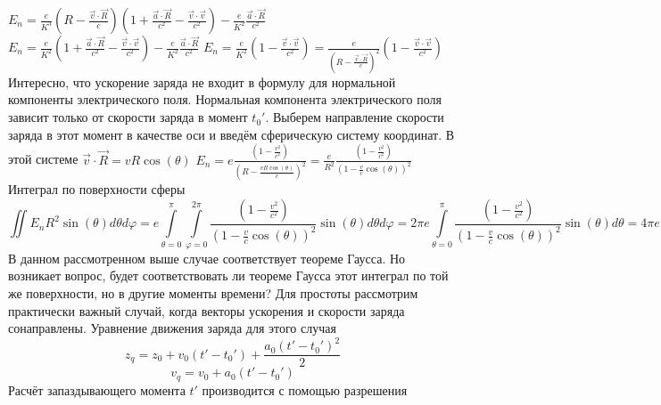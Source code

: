 \documentclass[11pt]{article}
\begin{document}
\({{E}_{n}}=\frac{e}{{{K}^{3}}}\left( R-\frac{\overrightarrow{v}\cdot \overrightarrow{R}}{c} \right)\left( 1+\frac{\overrightarrow{a}\cdot \overrightarrow{R}}{{{c}^{2}}}-\frac{\overrightarrow{v}\cdot \overrightarrow{v}}{{{c}^{2}}} \right)-\frac{e}{{{K}^{2}}}\frac{\overrightarrow{a}\cdot \overrightarrow{R}}{{{c}^{2}}}\)
\({{E}_{n}}=\frac{e}{{{K}^{2}}}\left( 1+\frac{\overrightarrow{a}\cdot \overrightarrow{R}}{{{c}^{2}}}-\frac{\overrightarrow{v}\cdot \overrightarrow{v}}{{{c}^{2}}} \right)-\frac{e}{{{K}^{2}}}\frac{\overrightarrow{a}\cdot \overrightarrow{R}}{{{c}^{2}}}\)
\({{E}_{n}}=\frac{e}{{{K}^{2}}}\left( 1-\frac{\overrightarrow{v}\cdot \overrightarrow{v}}{{{c}^{2}}} \right)=\frac{e}{{{\left( R-\frac{\overrightarrow{v}\cdot \overrightarrow{R}}{c} \right)}^{2}}}\left( 1-\frac{\overrightarrow{v}\cdot \overrightarrow{v}}{{{c}^{2}}} \right)\)
Интересно, что ускорение заряда не входит в формулу для нормальной
компоненты электрического поля. Нормальная компонента электрического
поля зависит только от скорости заряда в момент \({{t}_{0}}'\). Выберем
направление скорости заряда в этот момент в качестве оси и введём
сферическую систему координат. В этой системе
\(\overrightarrow{v}\cdot \overrightarrow{R}=vR\cos \left( \theta \right)\)
\({{E}_{n}}=e\frac{\left( 1-\frac{{{v}^{2}}}{{{c}^{2}}} \right)}{{{\left( R-\frac{vR\cos \left( \theta \right)}{c} \right)}^{2}}}=\frac{e}{{{R}^{2}}}\frac{\left( 1-\frac{{{v}^{2}}}{{{c}^{2}}} \right)}{{{\left( 1-\frac{v}{c}\cos \left( \theta \right) \right)}^{2}}}\)
Интеграл по поверхности сферы
\[\iint{{{E}_{n}}{{R}^{2}}}\sin \left( \theta  \right)d\theta d\varphi =e\int\limits_{\theta =0}^{\pi }{\int\limits_{\varphi =0}^{2\pi }{\frac{\left( 1-\frac{{{v}^{2}}}{{{c}^{2}}} \right)}{{{\left( 1-\frac{v}{c}\cos \left( \theta  \right) \right)}^{2}}}}}\sin \left( \theta  \right)d\theta d\varphi =2\pi e\int\limits_{\theta =0}^{\pi }{\frac{\left( 1-\frac{{{v}^{2}}}{{{c}^{2}}} \right)}{{{\left( 1-\frac{v}{c}\cos \left( \theta  \right) \right)}^{2}}}}\sin \left( \theta  \right)d\theta =4\pi e\]
В данном рассмотренном выше случае соответствует теореме Гаусса. Но
возникает вопрос, будет соответствовать ли теореме Гаусса этот интеграл
по той же поверхности, но в другие моменты времени? Для простоты
рассмотрим практически важный случай, когда векторы ускорения и скорости
заряда сонаправлены. Уравнение движения заряда для этого случая
\[{{z}_{q}}={{z}_{0}}+{{v}_{0}}\left( t'-{{t}_{0}}' \right)+\frac{{{a}_{0}}{{\left( t'-{{t}_{0}}' \right)}^{2}}}{2}\]
\[{{v}_{q}}={{v}_{0}}+{{a}_{0}}\left( t'-{{t}_{0}}' \right)\] Расчёт
запаздывающего момента \(t'\) производится с помощью разрешения
\end{document}
